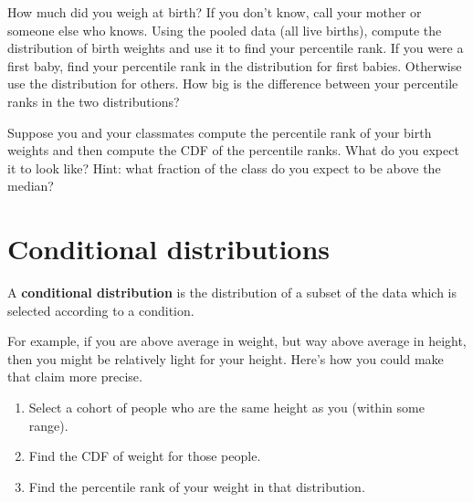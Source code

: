 \documentclass[12pt]{book}
\begin{document}



\begin{exercise}
How much did you weigh at birth?  If you don't know, call your mother
or someone else who knows.  Using the pooled data (all live births),
compute the distribution of birth weights and use it to find your
percentile rank.  If you were a first baby, find your percentile rank
in the distribution for first babies.  Otherwise use the distribution
for others.  How big is the difference between your percentile ranks
in the two distributions?

\end{exercise}

\begin{exercise}
Suppose you and your classmates compute the percentile rank of your
birth weights and then compute the CDF of the percentile ranks.  What do
you expect it to look like?  Hint: what fraction of the class do you
expect to be above the median?

\end{exercise}


\section{Conditional distributions}

A {\bf conditional distribution} is the distribution of a subset of
the data which is selected according to a condition.

For example, if you are above average in weight, but way above average
in height, then you might be relatively light for your height.  Here's
how you could make that claim more precise.

\begin{enumerate}

\item Select a cohort of people who are the same height as you (within
some range).

\item Find the CDF of weight for those people.

\item Find the percentile rank of your weight in that distribution.

\end{enumerate}
\end{document}

